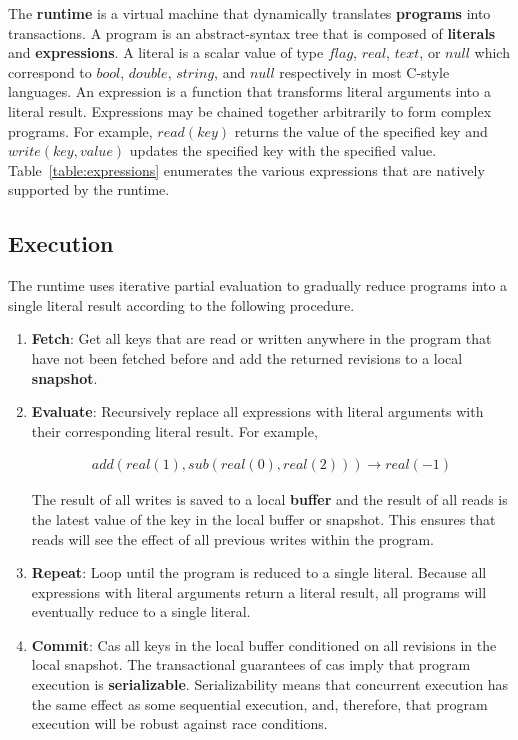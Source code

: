 \documentclass[../main.tex]{subfiles}
\begin{document}
The \textbf{runtime} is a virtual machine that dynamically translates \textbf{programs} into
transactions. A program is an abstract-syntax tree that is composed of \textbf{literals} and
\textbf{expressions}. A literal is a scalar value of type $flag$, $real$, $text$, or $null$ which
correspond to $bool$, $double$, $string$, and $null$ respectively in most C-style languages. An
expression is a function that transforms literal arguments into a literal result. Expressions may be
chained together arbitrarily to form complex programs. For example, $read(key)$ returns the value of
the specified key and $write(key, value)$ updates the specified key with the specified value.
Table~\ref{table:expressions} enumerates the various expressions that are natively supported by the
runtime.

  \subsection{Execution}
  The runtime uses iterative partial evaluation to gradually reduce programs into a
  single literal result according to the following procedure.

  \begin{enumerate}
    \item \textbf{Fetch}: Get all keys that are read or written anywhere in the program that have
          not been fetched before and add the returned revisions to a local \textbf{snapshot}.
    \item \textbf{Evaluate}: Recursively replace all expressions with literal arguments with their
          corresponding literal result. For example,

          \[
          \begin{gathered}
          add(real(1), sub(real(0), real(2))) \rightarrow real(-1)
          \end{gathered}
          \]

          The result of all writes is saved to a local \textbf{buffer} and the result of all reads
          is the latest value of the key in the local buffer or snapshot. This ensures that reads
          will see the effect of all previous writes within the program.
    \item \textbf{Repeat}: Loop until the program is reduced to a single literal. Because all
          expressions with literal arguments return a literal result, all programs will eventually
          reduce to a single literal.
    \item \textbf{Commit}: Cas all keys in the local buffer conditioned on all revisions in
          the local snapshot. The transactional guarantees of cas imply that program execution is
          \textbf{serializable}. Serializability means that concurrent execution has the
          same effect as some sequential execution, and, therefore, that program execution will be
          robust against race conditions.
  \end{enumerate}
\end{document}
